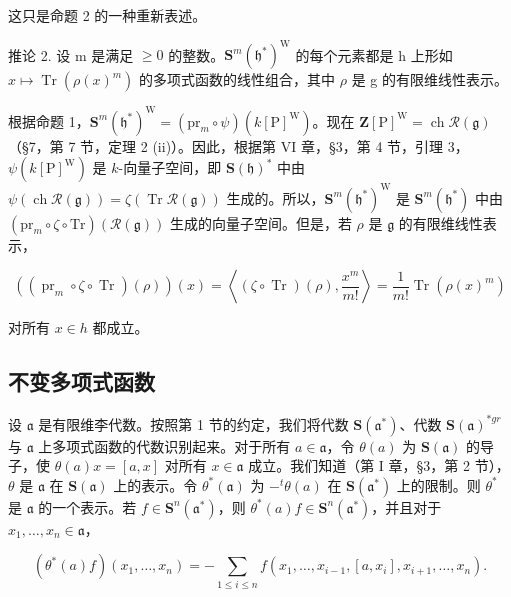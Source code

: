这只是命题 2 的一种重新表述。

推论 2. 设 m 是满足 \(\geq 0\) 的整数。\(\mathbf{S}^{m}(\mathfrak{h}^{*})^{\mathrm{W}}\) 的每个元素都是 h 上形如 \(x \mapsto \operatorname{Tr}(\rho(x)^{m})\) 的多项式函数的线性组合，其中 \(\rho\) 是 g 的有限维线性表示。

根据命题 1，\(\mathbf{S}^m (\mathfrak{h}^*)^{\mathrm{W}} = (\mathrm{pr}_m\circ \psi)(k[\mathrm{P}]^{\mathrm{W}})\)。现在 \(\mathbf{Z}[\mathrm{P}]^{\mathrm{W}} = \operatorname {ch}\mathcal{R}(\mathfrak{g})\)（§7，第 7 节，定理 2 (ii)）。因此，根据第 VI 章，§3，第 4 节，引理 3，\(\psi (k[\mathrm{P}]^{\mathrm{W}})\) 是 \(k\)-向量子空间，即 \(\mathbf{S}(\mathfrak{h})^{*}\) 中由 \(\psi (\operatorname {ch}\mathcal{R}(\mathfrak{g})) = \zeta (\operatorname {Tr}\mathcal{R}(\mathfrak{g}))\) 生成的。所以，\(\mathbf{S}^m (\mathfrak{h}^*)^{\mathrm{W}}\) 是 \(\mathbf{S}^m (\mathfrak{h}^*)\) 中由 \((\mathrm{pr}_m\circ \zeta \circ \mathrm{Tr})(\mathcal{R}(\mathfrak{g}))\) 生成的向量子空间。但是，若 \(\rho\) 是 \(\mathfrak{g}\) 的有限维线性表示，

\[
((\operatorname{pr} _ {m} \circ \zeta \circ \operatorname{Tr}) (\rho)) (x) = \left\langle (\zeta \circ \operatorname{Tr}) (\rho), \frac {x ^ {m}}{m !} \right\rangle = \frac {1}{m !} \operatorname{Tr} (\rho (x) ^ {m})
\]

对所有 \(x \in h\) 都成立。

\subsection{不变多项式函数}

设 \(\mathfrak{a}\) 是有限维李代数。按照第 1 节的约定，我们将代数 \(\mathbf{S}(\mathfrak{a}^{*})\)、代数 \(\mathbf{S}(\mathfrak{a})^{*gr}\) 与 \(\mathfrak{a}\) 上多项式函数的代数识别起来。对于所有 \(a \in \mathfrak{a}\)，令 \(\theta(a)\) 为 \(\mathbf{S}(\mathfrak{a})\) 的导子，使 \(\theta(a)x = [a, x]\) 对所有 \(x \in \mathfrak{a}\) 成立。我们知道（第 I 章，§3，第 2 节），\(\theta\) 是 \(\mathfrak{a}\) 在 \(\mathbf{S}(\mathfrak{a})\) 上的表示。令 \(\theta^{*}(\mathfrak{a})\) 为 \(-^{t}\theta(a)\) 在 \(\mathbf{S}(\mathfrak{a}^{*})\) 上的限制。则 \(\theta^{*}\) 是 \(\mathfrak{a}\) 的一个表示。若 \(f \in \mathbf{S}^{n}(\mathfrak{a}^{*})\)，则 \(\theta^{*}(a)f \in \mathbf{S}^{n}(\mathfrak{a}^{*})\)，并且对于 \(x_{1}, \ldots, x_{n} \in \mathfrak{a}\)，

\[
(\theta^ {*} (a) f) (x _ {1}, \dots , x _ {n}) = - \sum_ {1 \leq i \leq n} f (x _ {1}, \dots , x _ {i - 1}, [ a, x _ {i} ], x _ {i + 1}, \dots , x _ {n}).\tag{1}
\]

